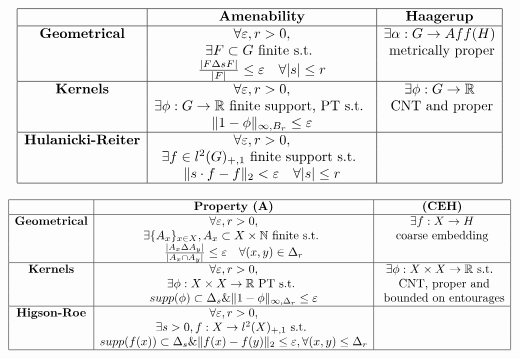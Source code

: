 \begin{table}[h]
\[\begin{array}{|c|c|c|}
\hline
                                                     & \textbf{Amenability} & \textbf{Haagerup}   \\
\hline
\textbf{Geometrical} &  
		\forall \varepsilon, r>0,   & 
		\exists \alpha : G \rightarrow Aff(H)  \\ 
			& \exists F\subset G \text{ finite s.t. }  & \text{ metrically proper} \\
			& \frac{|F\Delta s F|}{|F|}\leq \varepsilon \quad \forall |s|\leq r & \\
\hline
\textbf{Kernels} &
		\forall \varepsilon, r>0, &
		\exists \phi: G\rightarrow \mathbb R  \\
			&\exists \phi: G \rightarrow \mathbb R \text{ finite support, PT s.t. } & \text{ CNT and proper} \\
			& \|1-\phi\|_{\infty,B_r}\leq \varepsilon  & \\
\hline
\textbf{Hulanicki-Reiter} &
		\forall \varepsilon, r>0, &
		\\
			&\exists f\in l^2(G)_{+,1}\text{ finite support s.t. } & \\
		&  \|s\cdot f -f\|_2< \varepsilon \quad \forall |s|\leq r & \\
\hline
\end{array}\]
\end{table} 

\begin{table}[h]
\[\begin{array}{|c|c|c|}
\hline
                                                     &  \textbf{Property (A)}  & \textbf{(CEH)}    \\
\hline
\textbf{Geometrical} &  
		\forall \varepsilon, r>0,   & 
		\exists f: X \rightarrow H   \\ 
			& \exists \{A_x\}_{x\in X}, A_x\subset X\times \mathbb N \text{ finite s.t. } &\text{coarse embedding} \\
			& \frac{|A_x\Delta A_y|}{|A_x\cap A_y|}\leq \varepsilon \quad \forall (x,y)\in \Delta_r & \\
\hline
\textbf{Kernels} &
		\forall \varepsilon, r>0, &
		\exists \phi: X\times X\rightarrow \mathbb R \text{ s.t. } \\
			&\exists \phi: X\times X\rightarrow \mathbb R \text{ PT s.t. } & \text{ CNT, proper and} \\
			&supp(\phi)\subset \Delta_s \& \|1-\phi\|_{\infty,\Delta_r}\leq \varepsilon  & \text{ bounded on entourages}\\
\hline
\textbf{Higson-Roe} &
		\forall \varepsilon, r>0, &
		\\
			&\exists s>0, f: X\rightarrow  l^2(X)_{+,1}\text{ s.t. } & \\
		&   supp(f(x))\subset \Delta_s \& \|f(x) -f(y)\|_2\leq\varepsilon , \forall (x,y)\leq \Delta_r & \\
\hline
\end{array}\]
\end{table} 

